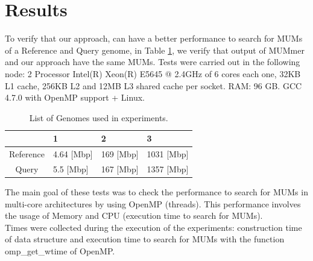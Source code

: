 \documentclass[runningheads,a4paper]{llncs}
\begin{document}
\section{Results}
To verify that our approach, can have a better performance to search for MUMs of a Reference and Query genome, in Table \ref{genomes}, we verify that output of MUMmer and our approach have the same MUMs. Tests were carried out in the following node: 2 Processor Intel(R) Xeon(R) E5645 @ 2.4GHz of 6 cores each one, 32KB L1 cache, 256KB L2 and 12MB L3 shared cache per socket. RAM: 96 GB. GCC 4.7.0 with OpenMP support + Linux. 
\begin{table} 
\centering
\caption{List of Genomes used in experiments.}
\label{genomes}
\begin{tabular}{|c|l|l|l|} \hline
  & 1 & 2 & 3 \\ \hline
  Reference & 4.64 [Mbp] & 169 [Mbp] & 1031 [Mbp] \\ \hline
  Query & 5.5 [Mbp] & 167 [Mbp] & 1357 [Mbp] \\ 
  \hline
\end{tabular}
\end{table}
The main goal of these tests was to check the performance to search for MUMs in multi-core architectures by using OpenMP (threads). This performance involves the usage of Memory and CPU (execution time to search for MUMs).\\
Times were collected during the execution of the experiments: construction time of data structure and execution time to search for MUMs with the function omp\_get\_wtime of OpenMP.\\
\end{document}
